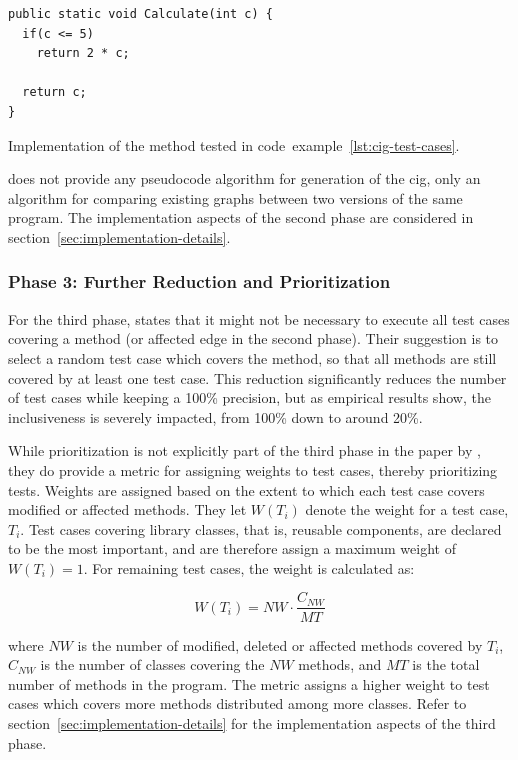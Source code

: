 \documentclass[a4paper,english,12pt]{report}
\begin{document}
\begin{listing}[htbp]
{\footnotesize
\begin{verbatim}
public static void Calculate(int c) {
  if(c <= 5)
    return 2 * c;
    
  return c;
}
\end{verbatim}
}
\caption{Implementation of the method tested in code~example~\ref{lst:cig-test-cases}.}
\label{lst:cig-test-method}
\end{listing}

\citet{mansour2009regression} does not provide any pseudocode algorithm for generation of the \gls{cig}, only an algorithm for comparing existing graphs between two versions of the same program. The implementation aspects of the second phase are considered in section~\vref{sec:implementation-details}.

\subsubsection{Phase 3: Further Reduction and Prioritization}
For the third phase, \citet{mansour2009regression} states that it might not be necessary to execute all test cases covering a method (or affected edge in the second phase). Their suggestion is to select a random test case which covers the method, so that all methods are still covered by at least one test case. This reduction significantly reduces the number of test cases while keeping a 100\% precision, but as empirical results show, the inclusiveness is severely impacted, from 100\% down to around 20\%.

While prioritization is not explicitly part of the third phase in the paper by \citeauthor{mansour2009regression}, they do provide a metric for assigning weights to test cases, thereby prioritizing tests. Weights are assigned based on the extent to which each test case covers modified or affected methods. They let $W(T_i)$ denote the weight for a test case, $T_i$. Test cases covering library classes, that is, reusable components, are declared to be the most important, and are therefore assign a maximum weight of $W(T_i)=1$. For remaining test cases, the weight is calculated as:

\begin{equation}\label{eq:weighting}
  W(T_i)= \mathit{NW} \cdot \frac{C_{\mathit{NW}}}{\mathit{MT}}
\end{equation}

\noindent where $\mathit{NW}$ is the number of modified, deleted or affected methods covered by $T_i$, $C_{\mathit{NW}}$ is the number of classes covering the $\mathit{NW}$ methods, and $\mathit{MT}$ is the total number of methods in the program. The metric assigns a higher weight to test cases which covers more methods distributed among more classes. Refer to section~\ref{sec:implementation-details} for the implementation aspects of the third phase.
\end{document}
